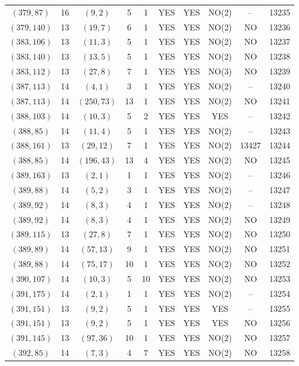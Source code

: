 \begin{longtable}{|c|c|c|c|c|c|c|c|c|c|}
$(379, 87)$ & 16 & $(9, 2)$ & 5 & 1 & YES & YES & NO(2) & -- & 13235\\
$(379, 140)$ & 13 & $(19, 7)$ & 6 & 1 & YES & YES & NO(2) & NO & 13236\\
$(383, 106)$ & 13 & $(11, 3)$ & 5 & 1 & YES & YES & NO(2) & NO & 13237\\
$(383, 140)$ & 13 & $(13, 5)$ & 5 & 1 & YES & YES & NO(2) & NO & 13238\\
$(383, 112)$ & 13 & $(27, 8)$ & 7 & 1 & YES & YES & NO(3) & NO & 13239\\
$(387, 113)$ & 14 & $(4, 1)$ & 3 & 1 & YES & YES & NO(2) & -- & 13240\\
$(387, 113)$ & 14 & $(250, 73)$ & 13 & 1 & YES & YES & NO(2) & NO & 13241\\
$(388, 103)$ & 14 & $(10, 3)$ & 5 & 2 & YES & YES & YES & -- & 13242\\
$(388, 85)$ & 14 & $(11, 4)$ & 5 & 1 & YES & YES & NO(2) & -- & 13243\\
$(388, 161)$ & 13 & $(29, 12)$ & 7 & 1 & YES & YES & NO(2) & 13427 & 13244\\
$(388, 85)$ & 14 & $(196, 43)$ & 13 & 4 & YES & YES & NO(2) & NO & 13245\\
$(389, 163)$ & 13 & $(2, 1)$ & 1 & 1 & YES & YES & NO(2) & -- & 13246\\
$(389, 88)$ & 14 & $(5, 2)$ & 3 & 1 & YES & YES & NO(2) & -- & 13247\\
$(389, 92)$ & 14 & $(8, 3)$ & 4 & 1 & YES & YES & NO(2) & -- & 13248\\
$(389, 92)$ & 14 & $(8, 3)$ & 4 & 1 & YES & YES & NO(2) & NO & 13249\\
$(389, 115)$ & 13 & $(27, 8)$ & 7 & 1 & YES & YES & NO(2) & NO & 13250\\
$(389, 89)$ & 14 & $(57, 13)$ & 9 & 1 & YES & YES & NO(2) & NO & 13251\\
$(389, 88)$ & 14 & $(75, 17)$ & 10 & 1 & YES & YES & NO(2) & NO & 13252\\
$(390, 107)$ & 14 & $(10, 3)$ & 5 & 10 & YES & YES & NO(2) & NO & 13253\\
$(391, 175)$ & 14 & $(2, 1)$ & 1 & 1 & YES & YES & NO(2) & -- & 13254\\
$(391, 151)$ & 13 & $(9, 2)$ & 5 & 1 & YES & YES & YES & -- & 13255\\
$(391, 151)$ & 13 & $(9, 2)$ & 5 & 1 & YES & YES & YES & NO & 13256\\
$(391, 145)$ & 13 & $(97, 36)$ & 10 & 1 & YES & YES & NO(2) & NO & 13257\\
$(392, 85)$ & 14 & $(7, 3)$ & 4 & 7 & YES & YES & NO(2) & NO & 13258\\

\end{longtable}
